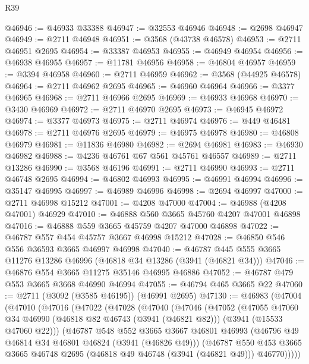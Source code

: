 \begin{lexlean}{R39}
\begin{coremodule}
@46946 := @46933 @33388
@46947 := @32553 @46946
@46948 := @2698 @46947
@46949 := @2711 @46948
@46951 := @3568 (@43738 @46578)
@46953 := @2711 @46951 @2695
@46954 := @33387 @46953
@46955 := @46949 @46954
@46956 := @46938 @46955
@46957 := @11781 @46956
@46958 := @46804 @46957
@46959 := @3394 @46958
@46960 := @2711 @46959
@46962 := @3568 (@44925 @46578)
@46964 := @2711 @46962 @2695
@46965 := @46960 @46964
@46966 := @3377 @46965
@46968 := @2711 @46966 @2695
@46969 := @46933 @46968
@46970 := @3430 @46969
@46972 := @2711 @46970 @2695
@46973 := @46945 @46972
@46974 := @3377 @46973
@46975 := @2711 @46974
@46976 := @449 @46481
@46978 := @2711 @46976 @2695
@46979 := @46975 @46978
@46980 := @46808 @46979
@46981 := @11836 @46980
@46982 := @2694 @46981
@46983 := @46930 @46982
@46988 := @4236 @46761 @67 @561 @45761 @46557
@46989 := @2711 @13286
@46990 := @3568 @46196
@46991 := @2711 @46990
@46993 := @2711 @46748 @2695
@46994 := @46802 @46993
@46995 := @46991 @46994
@46996 := @35147 @46995
@46997 := @46989 @46996
@46998 := @2694 @46997
@47000 := @2711 @46998 @15212
@47001 := @4208 @47000
@47004 := @46988 (@4208 @47001) @46929
@47010 := @46888 @560 @3665 @45760 @4207 @47001 @46898
@47016 := @46888 @559 @3665 @45759 @4207 @47000 @46898
@47022 := @46787 @557 @454 @45757 @3667 @46998 @15212
@47028 := @46850 @546 @556 @36593 @3665 @46997 @46998
@47040 := @46787 @445 @555 @3665 @11276 @13286 @46996 (@46818 @34 @13286 (@3941 (@46821 @34)))
@47046 := @46876 @554 @3665 @11275 @35146 @46995 @46886
@47052 := @46787 @479 @553 @3665 @3668 @46990 @46994
@47055 := @46794 @465 @3665 @22
@47060 := @2711 (@3092 (@3585 @46195)) (@46991 @2695)
@47130 := @46983
    (@47004
      (@47010
        (@47016
          (@47022
            (@47028
              (@47040
                (@47046
                  (@47052
                    (@47055
                      @47060
                      @34
                      @46990
                      (@46818 @82 @46743 (@3941 (@46821 @82)))
                      (@3941 (@15533 @47060 @22)))
                    (@46787
                      @548
                      @552
                      @3665
                      @3667
                      @46801
                      @46993
                      (@46796 @49 @46814 @34 @46801 @46824 (@3941 (@46826 @49)))
                      (@46787
                        @550
                        @453
                        @3665
                        @3665
                        @46748
                        @2695
                        (@46818 @49 @46748 (@3941 (@46821 @49)))
                        @46770)))))

\end{coremodule}
\end{lexlean}
